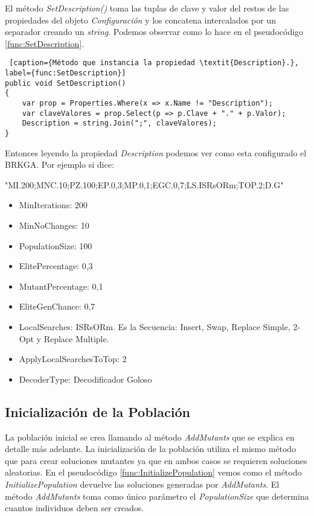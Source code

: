 \bigskip

El método \textit{SetDescription()} toma las tuplas de clave y valor del restos de las propiedades del objeto \textit{Configuración} y los concatena intercalados por un separador creando un \textit{string}. Podemos observar como lo hace en el pseudocódigo \ref{func:SetDescription}.

\bigskip

\begin{minipage}{\linewidth}
\begin{lstlisting} [caption={Método que instancia la propiedad \textit{Description}.}, label={func:SetDescription}]
public void SetDescription()
{ 
	var prop = Properties.Where(x => x.Name != "Description");
	var claveValores = prop.Select(p => p.Clave + "." + p.Valor);
	Description = string.Join(";", claveValores);
}
\end{lstlisting}
\end{minipage}

\bigskip

\begin{minipage}{\textwidth}
Entonces leyendo la propiedad \textit{Description} podemos ver como esta configurado el BRKGA. Por ejemplo si dice: 

\bigskip"MI.200;MNC.10;PZ.100;EP.0,3;MP.0,1;EGC.0,7;LS.ISRsORm;TOP.2;D.G"

\begin{itemize}
  \item MinIterations: 200
  \item MinNoChanges: 10
  \item PopulationSize: 100
  \item ElitePercentage: 0,3
  \item MutantPercentage: 0,1
  \item EliteGenChance: 0,7
  \item LocalSearches: ISRsORm. Es la Secuencia: Insert, Swap, Replace Simple, 2-Opt y Replace Multiple.
  \item ApplyLocalSearchesToTop: 2
  \item DecoderType: Decodificador Goloso
\end{itemize}
\end{minipage}

\subsection{Inicialización de la Población}\label{subsec:InitializePopulation}

La población inicial se crea llamando al método \textit{AddMutants} que se explica en detalle más adelante. La inicialización de la población utiliza el mismo método que para crear soluciones mutantes ya que en ambos casos se requieren soluciones aleatorias. En el pseudocódigo \ref{func:InitializePopulation} vemos como el método \textit{InitializePopulation} devuelve las soluciones generadas por \textit{AddMutants}. El método \textit{AddMutants} toma como único parámetro el \textit{PopulationSize} que determina cuantos individuos deben ser creados.

